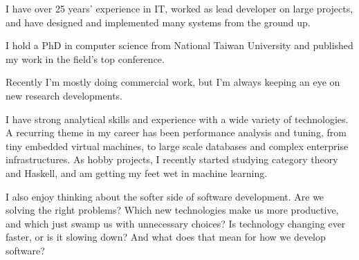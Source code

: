 \documentclass[10pt,a4paper]{../altacv}
\begin{document}

\begin{fullwidth}
\makecvheader

I have over 25 years’ experience in IT, worked as lead developer on large projects, and have designed and implemented many systems from the ground up.

\medskip

I hold a PhD in computer science from National Taiwan University and published my work in the field’s top conference.

\medskip

Recently I'm mostly doing commercial work, but I’m always keeping an eye on new research developments.

\medskip

I have strong analytical skills and experience with a wide variety of technologies. A recurring theme in my career has been performance analysis and tuning, from tiny embedded virtual machines, to large scale databases and complex enterprise infrastructures. As hobby projects, I recently started studying category theory and Haskell, and am getting my feet wet in machine learning.

\medskip

I also enjoy thinking about the softer side of software development. Are we solving the right problems? Which new technologies make us more productive, and which just swamp us with unnecessary choices? Is technology changing ever faster, or is it slowing down? And what does that mean for how we develop software?

\end{fullwidth}

\small


\end{document}
